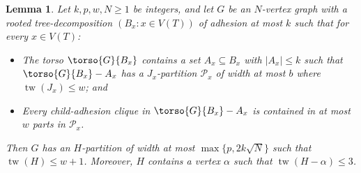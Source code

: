 \documentclass[12pt]{article}
\renewcommand{\geq}{\geqslant}
\renewcommand{\leq}{\leqslant}
\DeclareMathOperator{\tw}{tw}
\newcommand{\PP}{\mathcal{P}}
\theoremstyle{plain}
\newtheorem{lem}[thm]{Lemma}
\theoremstyle{definition}
\begin{document}
\begin{lem}\label{AlternativeCliqueSums}
    Let $k,p,w,N\geq 1$ be integers, and let $G$ be an $N$-vertex graph with a rooted tree-decomposition $(B_x:x\in V(T))$ of adhesion at most $k$ such that for every $x\in V(T)$:
    \begin{itemize}
        \item The torso $\torso{G}{B_x}$ contains a set $A_x\subseteq B_x$ with $|A_x|\leq k$ such that $\torso{G}{B_x}-A_x$ has a $J_x$-partition $\PP_x$ of width at most $b$ where $\tw(J_x)\leq w$; and
        \item Every child-adhesion clique in $\torso{G}{B_x}-A_x$ is contained in at most $w$ parts in $\PP_x$.
    \end{itemize}
     Then $G$ has an $H$-partition of width at most $\max\{p,2k\sqrt{N}\}$ such that $\tw(H)\leq w+1$. Moreover, $H$ contains a vertex $\alpha$ such that $\tw(H-\alpha)\leq 3$.
\end{lem}
\end{document}
